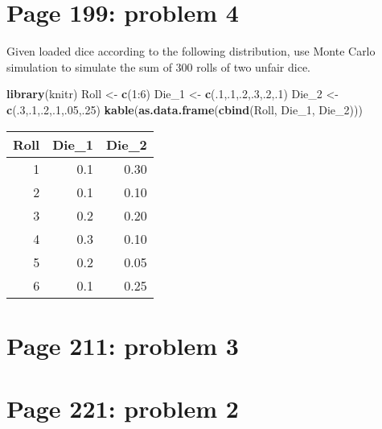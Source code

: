 \documentclass[]{article}
\newenvironment{Shaded}{\begin{snugshade}}{\end{snugshade}}
\newcommand{\KeywordTok}[1]{\textcolor[rgb]{0.13,0.29,0.53}{\textbf{{#1}}}}
\newcommand{\DecValTok}[1]{\textcolor[rgb]{0.00,0.00,0.81}{{#1}}}
\newcommand{\StringTok}[1]{\textcolor[rgb]{0.31,0.60,0.02}{{#1}}}
\newcommand{\NormalTok}[1]{{#1}}
\begin{document}
\section{Page 199: problem 4}\label{page-199-problem-4}

Given loaded dice according to the following distribution, use Monte
Carlo simulation to simulate the sum of 300 rolls of two unfair dice.

\begin{Shaded}
\begin{Highlighting}[]
\KeywordTok{library}\NormalTok{(knitr)}
\NormalTok{Roll <-}\StringTok{ }\KeywordTok{c}\NormalTok{(}\DecValTok{1}\NormalTok{:}\DecValTok{6}\NormalTok{)}
\NormalTok{Die_1 <-}\StringTok{ }\KeywordTok{c}\NormalTok{(.}\DecValTok{1}\NormalTok{,.}\DecValTok{1}\NormalTok{,.}\DecValTok{2}\NormalTok{,.}\DecValTok{3}\NormalTok{,.}\DecValTok{2}\NormalTok{,.}\DecValTok{1}\NormalTok{)}
\NormalTok{Die_2 <-}\StringTok{ }\KeywordTok{c}\NormalTok{(.}\DecValTok{3}\NormalTok{,.}\DecValTok{1}\NormalTok{,.}\DecValTok{2}\NormalTok{,.}\DecValTok{1}\NormalTok{,.}\DecValTok{05}\NormalTok{,.}\DecValTok{25}\NormalTok{)}
\KeywordTok{kable}\NormalTok{(}\KeywordTok{as.data.frame}\NormalTok{(}\KeywordTok{cbind}\NormalTok{(Roll, Die_1, Die_2)))}
\end{Highlighting}
\end{Shaded}

\begin{longtable}[]{@{}rrr@{}}
\toprule
Roll & Die\_1 & Die\_2\tabularnewline
\midrule
\endhead
1 & 0.1 & 0.30\tabularnewline
2 & 0.1 & 0.10\tabularnewline
3 & 0.2 & 0.20\tabularnewline
4 & 0.3 & 0.10\tabularnewline
5 & 0.2 & 0.05\tabularnewline
6 & 0.1 & 0.25\tabularnewline
\bottomrule
\end{longtable}

\section{Page 211: problem 3}\label{page-211-problem-3}

\section{Page 221: problem 2}\label{page-221-problem-2}
\end{document}
